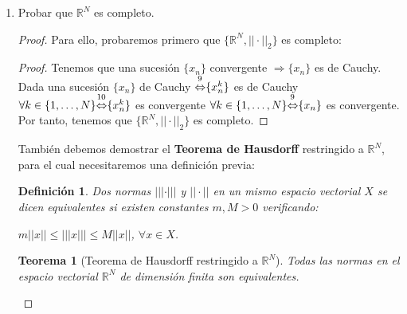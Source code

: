 \documentclass[a4paper, 11pt]{article} %
\newtheorem*{mydef}{Definición}
\newtheorem{theorem}{Teorema}
\begin{document}
\begin{enumerate}
\begin{enumerate}[label=\alph*)]
\begin{proof}
			Por tanto, $K \subset D^c\left(A^c, \frac{1}{p} \right) \cap \overline{B}(0,p) = K_p$.\\
		\end{proof}
	\end{enumerate}
	\item Probar que $\mathbb{R}^N$ es completo.
	\begin{proof}
		Para ello, probaremos primero que $\{\mathbb{R}^N, ||\cdot||_2\}$ es completo:
		\begin{proof}
			Tenemos que una sucesión $\{x_n\}$ convergente $\Rightarrow \{x_n\}$ es de Cauchy.\\
			Dada una sucesión $\{x_n\}$ de Cauchy $\accentset{\footnotemark[9]}\Leftrightarrow \{x_n^k\}$ es de Cauchy $\forall k \in \{1,\dots,N\} \accentset{\footnotemark[10]}\Leftrightarrow \{x_n^k\}$ es convergente $\forall k \in \{1,\dots,N\} \accentset{\footnotemark[9]}\Leftrightarrow \{x_n\}$ es convergente.\\
			Por tanto, tenemos que $\{\mathbb{R}^N, ||\cdot||_2\}$ es completo.
		\end{proof}
		
		También debemos demostrar el \textbf{Teorema de Hausdorff} restringido a $\mathbb{R}^N$, para el cual necesitaremos una definición previa:
		\begin{mydef}
			Dos normas $|||\cdot|||$ y $||\cdot||$ en un mismo espacio vectorial $X$ se dicen equivalentes si existen constantes $m,M>0$ verificando:
			\begin{center}
				$m ||x|| \le |||x||| \le M ||x||$, $\forall x \in X$.
			\end{center}
		\end{mydef}
		
		\begin{theorem}[Teorema de Hausdorff restringido a $\mathbb{R}^N$]
			Todas las normas en el espacio vectorial $\mathbb{R}^N$ de dimensión finita son equivalentes.
		\end{theorem}
		

\end{proof}
\end{enumerate}
\end{document}
